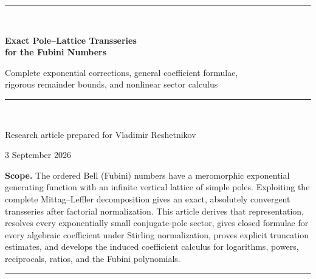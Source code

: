 \documentclass[11pt,oneside]{article}
\numberwithin{equation}{section}
\begin{document}
\hypersetup{pageanchor=false}

\begin{titlepage}
\centering
\vspace*{1.2cm}
{\color{DeepBlue}\rule{0.92\textwidth}{1.2pt}}\\[1.25cm]
{\Huge\bfseries Exact Pole--Lattice Transseries\\[0.2em]
for the Fubini Numbers\par}
\vspace{0.55cm}
{\Large Complete exponential corrections, general coefficient formulae,\\
rigorous remainder bounds, and nonlinear sector calculus\par}
\vspace{1.1cm}
{\color{DeepBlue}\rule{0.72\textwidth}{0.7pt}}\\[1.1cm]
{\large Research article prepared for Vladimir Reshetnikov\par}
\vspace{0.3cm}
{\large 3 September 2026\par}
\vfill
\begin{minipage}{0.86\textwidth}
\small
\textbf{Scope.} The ordered Bell (Fubini) numbers have a meromorphic exponential generating function with an infinite vertical lattice of simple poles.  Exploiting the complete Mittag--Leffler decomposition gives an exact, absolutely convergent transseries after factorial normalization.  This article derives that representation, resolves every exponentially small conjugate-pole sector, gives closed formulae for every algebraic coefficient under Stirling normalization, proves explicit truncation estimates, and develops the induced coefficient calculus for logarithms, powers, reciprocals, ratios, and the Fubini polynomials.
\end{minipage}
\vfill
{\color{DeepBlue}\rule{0.92\textwidth}{1.2pt}}
\end{titlepage}
\hypersetup{pageanchor=true}
\end{document}
